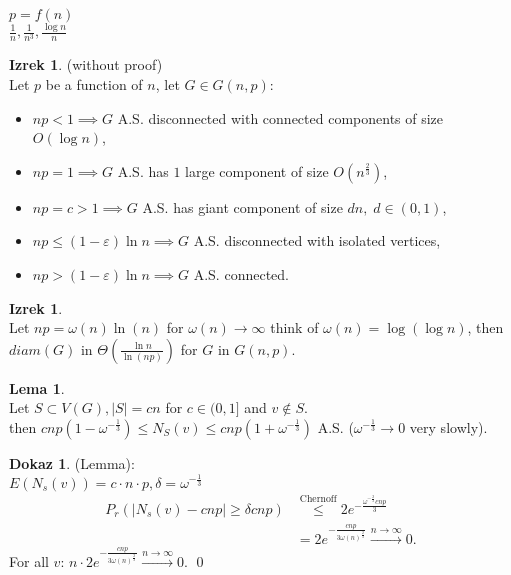 \documentclass[a4paper, 12pt]{book}
\theoremstyle{definition}
\newtheorem{lemma}[counter]{Lema}
\newtheorem{theorem}[counter]{Izrek}
\newtheorem{pro}[counter]{Dokaz}
\theoremstyle{remark}
\begin{document}
$p = f(n)$ \\
$\frac{1}{n}, \frac{1}{n^3}, \frac{\log n}{n}$
\begin{theorem} (without proof) \\
  Let $p$ be a function of $n$, let $G \in G(n,p)$:
  \begin{itemize}
    \item $np < 1 \implies G$ A.S. disconnected with connected components of size $O(\log n)$,
    \item $np = 1 \implies G$ A.S. has $1$ large component of size $O\left(n^{\frac{2}{3}}\right)$,
    \item $np = c > 1 \implies G$ A.S. has giant component of size $dn, \; d \in (0,1)$,
    \item $np \leq (1-\varepsilon) \ln n \implies G$ A.S. disconnected with isolated vertices,
    \item $np > (1-\varepsilon) \ln n \implies G$ A.S. connected.
  \end{itemize}
\end{theorem}
\begin{theorem} \text{} \\
  Let $np = \omega(n) \ln(n)$ for $\omega(n) \to \infty$  think of $\omega(n) = \log (\log n)$,
  then $diam(G)$ in $\Theta\left(\frac{\ln n}{\ln (np)}\right)$ for $G$ in $G(n,p)$.
\end{theorem}
\begin{lemma} \text{} \\
  Let $S \subset V(G), |S| = cn$ for $c \in (0,1]$ and $v \notin S$. \\
  then $cnp(1-\omega^{-\frac{1}{3}}) \leq N_S(v) \leq cnp(1+\omega^{-\frac{1}{3}})$ A.S.
  ($\omega^{-\frac{1}{3}} \to 0$ very slowly).
\end{lemma}
\begin{pro}(Lemma): \\
  $E(N_s(v)) = c \cdot n \cdot p, \delta = \omega^{-\frac{1}{3}}$ \\
  \begin{align*}
    P_r(|N_s(v) - cnp| \geq \delta cnp) &\stackrel{\text{Chernoff}}{\leq} 2 e^{-\frac{\omega^{-\frac{2}{3}} cnp}{3}} \\
    &= 2 e^{-\frac{cnp}{3 \omega(n)^{\frac{2}{3}}}} \stackrel{n \to \infty}{\longrightarrow} 0.
  \end{align*}
  For all $v$: $n \cdot 2 e^{-\frac{cnp}{3 \omega(n)^{\frac{2}{3}}}} \stackrel{n \to \infty}{\longrightarrow} 0$.
  \qed
\end{pro}
\end{document}
